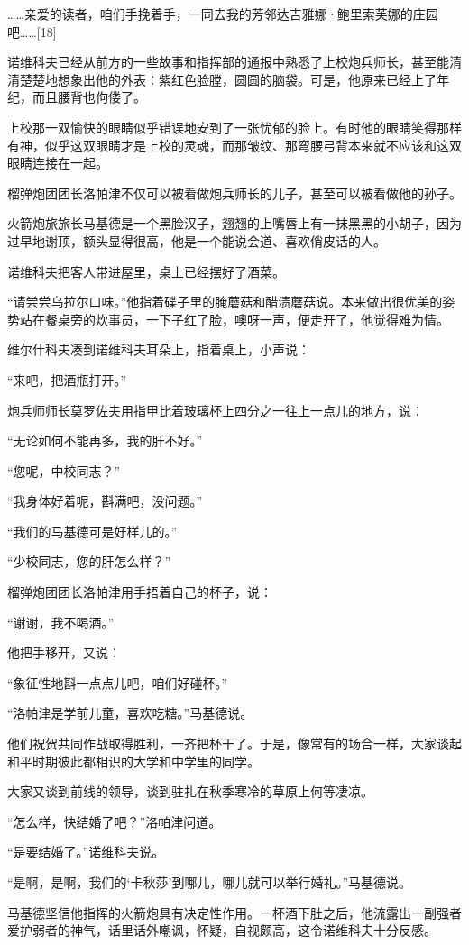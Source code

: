 ……亲爱的读者，咱们手挽着手，一同去我的芳邻达吉雅娜·鲍里索芙娜的庄园吧……[18]

诺维科夫已经从前方的一些故事和指挥部的通报中熟悉了上校炮兵师长，甚至能清清楚楚地想象出他的外表：紫红色脸膛，圆圆的脑袋。可是，他原来已经上了年纪，而且腰背也佝偻了。

上校那一双愉快的眼睛似乎错误地安到了一张忧郁的脸上。有时他的眼睛笑得那样有神，似乎这双眼睛才是上校的灵魂，而那皱纹、那弯腰弓背本来就不应该和这双眼睛连接在一起。

榴弹炮团团长洛帕津不仅可以被看做炮兵师长的儿子，甚至可以被看做他的孙子。

火箭炮旅旅长马基德是一个黑脸汉子，翘翘的上嘴唇上有一抹黑黑的小胡子，因为过早地谢顶，额头显得很高，他是一个能说会道、喜欢俏皮话的人。

诺维科夫把客人带进屋里，桌上已经摆好了酒菜。

“请尝尝乌拉尔口味。”他指着碟子里的腌蘑菇和醋渍蘑菇说。本来做出很优美的姿势站在餐桌旁的炊事员，一下子红了脸，噢呀一声，便走开了，他觉得难为情。

维尔什科夫凑到诺维科夫耳朵上，指着桌上，小声说：

“来吧，把酒瓶打开。”

炮兵师师长莫罗佐夫用指甲比着玻璃杯上四分之一往上一点儿的地方，说：

“无论如何不能再多，我的肝不好。”

“您呢，中校同志？”

“我身体好着呢，斟满吧，没问题。”

“我们的马基德可是好样儿的。”

“少校同志，您的肝怎么样？”

榴弹炮团团长洛帕津用手捂着自己的杯子，说：

“谢谢，我不喝酒。”

他把手移开，又说：

“象征性地斟一点点儿吧，咱们好碰杯。”

“洛帕津是学前儿童，喜欢吃糖。”马基德说。

他们祝贺共同作战取得胜利，一齐把杯干了。于是，像常有的场合一样，大家谈起和平时期彼此都相识的大学和中学里的同学。

大家又谈到前线的领导，谈到驻扎在秋季寒冷的草原上何等凄凉。

“怎么样，快结婚了吧？”洛帕津问道。

“是要结婚了。”诺维科夫说。

“是啊，是啊，我们的‘卡秋莎’到哪儿，哪儿就可以举行婚礼。”马基德说。

马基德坚信他指挥的火箭炮具有决定性作用。一杯酒下肚之后，他流露出一副强者爱护弱者的神气，话里话外嘲讽，怀疑，自视颇高，这令诺维科夫十分反感。

